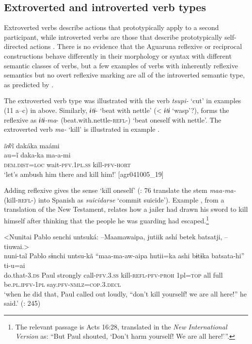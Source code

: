 \documentclass[output=paper]{langscibook}
\begin{document}
\subsection{Extroverted and introverted verb types} %
\label{sec:overall:4.1}

Extroverted verbs describe actions that prototypically apply to a second participant, while introverted verbs are those that describe prototypically self-directed actions
\citep[803]{Haiman1983}. There is no evidence that the Aguaruna reflexive or reciprocal constructions behave differently in their morphology or syntax with different semantic classes of verbs, but a few examples of verbs with inherently reflexive semantics but no overt reflexive marking are all of the introverted semantic type, as predicted by \citet{Haiman1983}.

The extroverted verb type was illustrated with the verb \textit{tsupi-} ‘cut’ in examples (11 a–c) in  above. Similarly, \textit{ɨtɨ}{}- ‘beat with nettle’ (< \textit{ɨtɨ} ‘wasp’?), forms the reflexive as \textit{ɨtɨ-ma}{}- (beat.with.nettle-\textsc{refl{}-) ‘}beat oneself with nettle’. The extroverted verb \textit{ma-} ‘kill’ is illustrated in example .

\ea%
    \label{ex:overall:22}
    \glll ã\'\~{w}ĩ dakáka maámi\\
  au=ĩ  daka-ka  ma-a-mi\\
  \textsc{dem.dist}=\textsc{loc}  wait-\textsc{pfv.1pl.ss}  kill-\textsc{pfv-hort}\\
  \glt  ‘let’s ambush him there and kill him!’ [agr041005\_19]
\z

Adding reflexive gives the sense ‘kill oneself’ (\citealt{UwaraiEtAl1998}: 76 translate the stem \textit{maa-ma-} (kill-\textsc{refl}{}-) into Spanish as \textit{suicidarse} ‘commit suicide’). Example , from a translation of the New Testament, relates how a jailer had drawn his sword to kill himself after thinking that the people he was guarding had escaped.\footnote{The relevant passage is Acts 16:28, translated in the \textit{New International Version} as: “But Paul shouted, ‘Don't harm yourself! We are all here!’”.}

\ea%
    \label{ex:overall:23}
  \glll <Nunitai Pablo senchi untsuká: –Maamawaipa, jutiik ashí betek batsatji, –tiuwai.> \\
  nuni-taĩ  Pablo  sɨnchi  untsu-kã  “maa-ma-aw-aipa hutii=ka  ashi  bɨtɨka  batsata-hi”  ti-u=ai\\
  do.that-\textsc{3.ds}  Paul  strongly  call-\textsc{pfv.3.ss}  kill-\textsc{refl-pfv-proh} 1pl=\textsc{top}  all  full  be.\textsc{pl.ipfv-1pl}  say.\textsc{pfv-nmlz=cop.3.decl}\\
  \glt  ‘when he did that, Paul called out loudly, “don’t kill yourself! we are all here!” he said.’ (\citealt{LaLigaBiblica2008}: 245)
  \z
\end{document}

